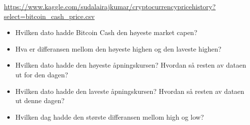 \documentclass{article}
\begin{document}
    \url{https://www.kaggle.com/sudalairajkumar/cryptocurrencypricehistory?select=bitcoin_cash_price.csv}

    \begin{itemize}
        \item Hvilken dato hadde Bitcoin Cash den høyeste market capen?
        \item Hva er differansen mellom den høyeste highen og den laveste highen?
        \item Hvilken dato hadde den høyeste åpningskursen? Hvordan så resten av dataen ut for den dagen?
        \item Hvilken dato hadde den laveste åpningskursen? Hvordan så resten av dataen ut denne dagen?
        \item Hvilken dag hadde den største differansen mellom high og low?
    \end{itemize}
    
\end{document}
